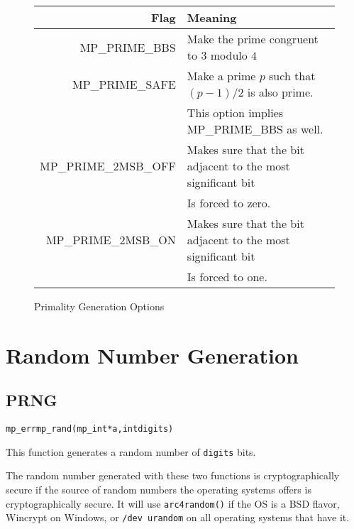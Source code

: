 \documentclass[synpaper]{book}
\begin{document}
\begin{figure}[h]
  \begin{center}
    \begin{small}
      \begin{tabular}{|r|l|}
        \hline \textbf{Flag}        & \textbf{Meaning}
        \\
        \hline MP\_PRIME\_BBS       & Make the prime congruent to $3$ modulo $4$
        \\
        \hline MP\_PRIME\_SAFE      & Make a prime $p$ such that $(p - 1)/2$ is also prime.
        \\
                                    & This option implies MP\_PRIME\_BBS as well.
        \\
        \hline MP\_PRIME\_2MSB\_OFF & Makes sure that the bit adjacent to the most significant bit
        \\
                                    & Is forced to zero.
        \\
        \hline MP\_PRIME\_2MSB\_ON  & Makes sure that the bit adjacent to the most significant bit
        \\
                                    & Is forced to one.
        \\
        \hline
      \end{tabular}
    \end{small}
  \end{center}
  \caption{Primality Generation Options}
  \label{fig:primeopts}
\end{figure}

\chapter{Random Number Generation}
\section{PRNG}
\begin{alltt}
mp_err mp_rand(mp_int *a, int digits)
\end{alltt}
This function generates a random number of \texttt{digits} bits.

The random number generated with these two functions is cryptographically secure if the source of
random numbers the operating systems offers is cryptographically secure. It will use
\texttt{arc4random()} if the OS is a BSD flavor, Wincrypt on Windows, or \texttt{/dev urandom} on
all operating systems that have it.
\end{document}
